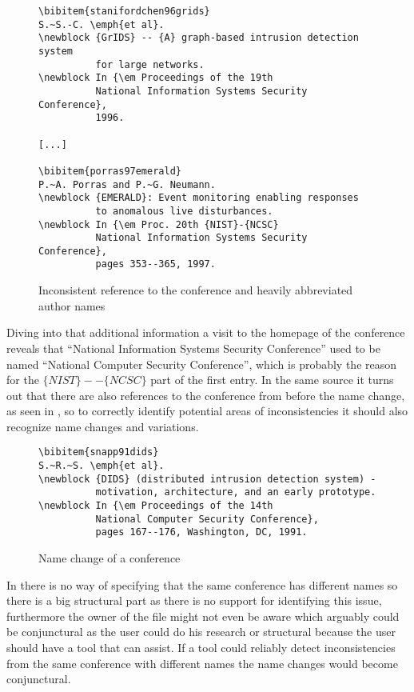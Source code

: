 \begin{figure}
  \centering
\begin{small}
\begin{verbatim}
\bibitem{stanifordchen96grids}
S.~S.-C. \emph{et al}.
\newblock {GrIDS} -- {A} graph-based intrusion detection system 
          for large networks.
\newblock In {\em Proceedings of the 19th
          National Information Systems Security Conference},
          1996.

[...]

\bibitem{porras97emerald}
P.~A. Porras and P.~G. Neumann.
\newblock {EMERALD}: Event monitoring enabling responses 
          to anomalous live disturbances.
\newblock In {\em Proc. 20th {NIST}-{NCSC}
          National Information Systems Security Conference},
          pages 353--365, 1997.

\end{verbatim}
\end{small}
  \caption{Inconsistent reference to the conference and heavily abbreviated author names}
\label{fig:entry_journal_name_authors}
\end{figure}

Diving into that additional information a visit to the homepage of the
conference reveals that ``National Information Systems Security
Conference'' used to be named ``National Computer Security
Conference'', which is probably the reason for the
$\{NIST\}--\{NCSC\}$ part of the first entry\cite{nist2014_nissc}.  In
the same source it turns out that there are also references to the
conference from before the name change, as seen in
, so to correctly identify potential areas
of inconsistencies it should also recognize name changes and
variations.

\begin{figure}
  \centering
\begin{small}
\begin{verbatim}
\bibitem{snapp91dids}
S.~R.~S. \emph{et al}.
\newblock {DIDS} (distributed intrusion detection system) -
          motivation, architecture, and an early prototype.
\newblock In {\em Proceedings of the 14th
          National Computer Security Conference},
          pages 167--176, Washington, DC, 1991.
\end{verbatim}
\end{small}
  \caption{Name change of a conference}
\label{fig:conference_name}
\end{figure}

In {\bibtex} there is no way of specifying that the same conference
has different names so there is a big structural part as there is no
support for identifying this issue, furthermore the owner of the
{\bibtex} file might not even be aware which arguably could be
conjunctural as the user could do his research or structural because
the user should have a tool that can assist.  If a tool could reliably
detect inconsistencies from the same conference with different names
the name changes would become conjunctural.



